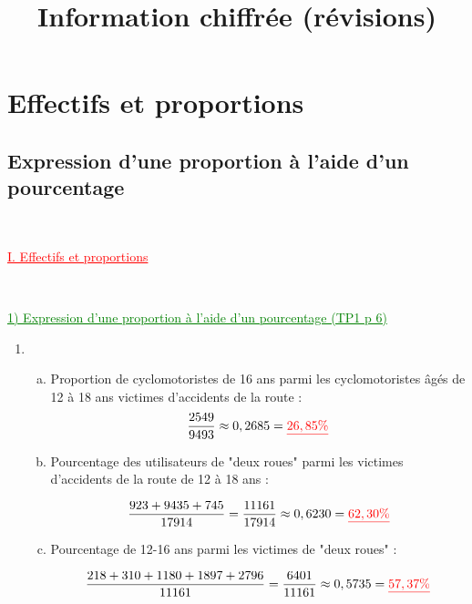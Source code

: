 \documentclass[xcolor={dvipsnames}]{beamer}
\title{Information chiffrée (révisions)}
\begin{document}
\begin{frame}
  \titlepage 
\end{frame}


	



\section{Effectifs et proportions}

\subsection{Expression d'une proportion à l'aide d'un pourcentage }


\begin{frame}
\

\begin{Large}
	\textcolor{Red}{\underline{I. Effectifs et proportions }}
\end{Large}\pause
\

\vspace*{1cm}

\textcolor{Green}{\underline{1) Expression d'une proportion à l'aide d'un pourcentage (TP1 p 6)}}
\end{frame}

\begin{frame}{}
	
\begin{enumerate}%
	\item 
	\begin{enumerate} [a)]
		\item Proportion de cyclomotoristes de 16 ans parmi les cyclomotoristes âgés de 12 à 18 ans victimes d'accidents de la route :\pause
		\begin{eqnarray*}
			\dfrac{2549}{9493} \approx 0,2685 = \textcolor{red}{\underline{26,85\%}}
		\end{eqnarray*}\pause
		
		\item Pourcentage des utilisateurs de "deux roues" parmi les victimes d'accidents de la route de 12 à 18 ans :\pause
		
		\begin{equation*}
		\dfrac{923 + 9435 + 745}{17914} = \dfrac{11 161}{17914} \approx 0,6230 = \textcolor{red}{\underline{62,30 \%}}
		\end{equation*}\pause
		
		\item Pourcentage de 12-16 ans parmi les victimes de "deux roues" :\pause
		
		\begin{equation*}
		\dfrac{218 + 310 + 1180 + 1897 + 2796}{11161} = \dfrac{6401}{11161} \approx 0,5735 = \textcolor{red}{\underline{57,37 \%}}
		\end{equation*}\pause
	\end{enumerate}
\end{enumerate}
\end{frame}
\end{document}
